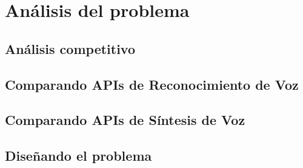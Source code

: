 \chapter{Análisis del problema}

\noindent{}

\section{Análisis competitivo}

\section{Comparando APIs de Reconocimiento de Voz}

\section{Comparando APIs de Síntesis de Voz}

\section{Diseñando el problema}
 
